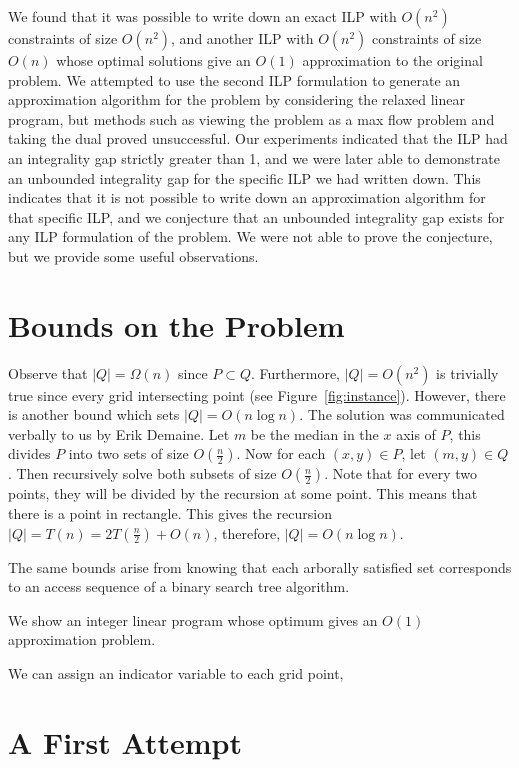 \documentclass[11pt]{article}
\begin{document}
We found that it was possible to write down an exact ILP with $O(n^2)$ constraints of size $O(n^2)$, and another ILP with $O(n^2)$ constraints of size $O(n)$ whose optimal solutions give an $O(1)$ approximation to the original problem. We attempted to use the second ILP formulation to generate an approximation algorithm for the problem by considering the relaxed linear program, but methods such as viewing the problem as a max flow problem and taking the dual proved unsuccessful. Our experiments indicated that the ILP had an integrality gap strictly greater than 1, and we were later able to demonstrate an unbounded integrality gap for the specific ILP we had written down. This indicates that it is not possible to write down an approximation algorithm for that specific ILP, and we conjecture that an unbounded integrality gap exists for any ILP formulation of the problem. We were not able to prove the conjecture, but we provide some useful observations.

\section{Bounds on the Problem}

Observe that $|Q| = \Omega(n)$ since $P \subset Q$. Furthermore, $|Q| = O(n^2)$ is trivially true since every grid intersecting point (see Figure~\ref{fig:instance}). However, there is another bound which sets $|Q| = O(n\log n)$. The solution was communicated verbally to us by Erik Demaine. Let $m$ be the median in the $x$ axis of $P$, this divides $P$ into two sets of size $O(\frac{n}{2})$. Now for each $(x,y) \in P$, let $(m, y) \in Q$. Then recursively solve both subsets of size $O(\frac{n}{2})$. Note that for every two points, they will be divided by the recursion at some point. This means that there is a point in rectangle. This gives the recursion $|Q| = T(n) = 2T(\frac{n}{2}) + O(n)$, therefore, $|Q| = O(n \log n)$. 

The same bounds arise from knowing that each arborally satisfied set corresponds to an access sequence of a binary search tree algorithm. \cite{geometryBST}

We show an integer linear program whose optimum gives an $O(1)$ approximation problem. 


We can assign an indicator variable to each grid point, 

\section{A First Attempt}
\end{document}
